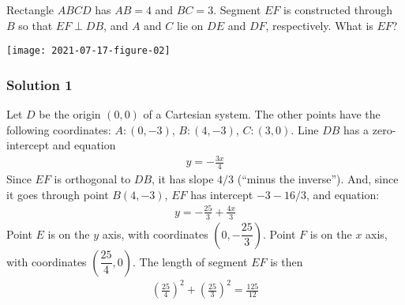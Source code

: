 \documentclass[12pt]{article}
\begin{document}
\nopagebreak

Rectangle $ABCD$ has $AB = 4$ and $BC = 3$. Segment $EF$ is constructed through $B$ so that $EF \perp DB$, and $A$ and $C$ lie on $DE$ and $DF$, respectively. What is $EF$?


\begin{answer}
\begin{center}
  \texttt{[image: 2021-07-17-figure-02]}
\end{center}
\subsubsection*{Solution 1}
Let $D$ be the origin $(0,0)$ of a Cartesian system. The other points have the following coordinates: $A:(0,-3)$, $B:(4,-3)$, $C:(3,0)$. Line $DB$ has a zero-intercept and equation
\begin{align*}
y = -\frac{3x}{4}
\end{align*}
Since $EF$ is orthogonal to $DB$, it has slope $4/3$ (``minus the inverse''). And, since it goes through point $B(4,-3)$, $EF$ has intercept $-3-16/3$, and equation:
\begin{align*}
y = -\frac{25}{3} + \frac{4x}{3}
\end{align*}
Point $E$ is on the $y$ axis, with coordinates $\left(0,-\dfrac{25}{3}\right)$. 
Point $F$ is on the $x$ axis, with coordinates $\left(\dfrac{25}{4},0\right)$. 
The length of segment $EF$ is then
\begin{align*}
\left(\frac{25}{4}\right)^2 + \left(\frac{25}{3}\right)^2
  = \frac{125}{12}
\end{align*}
\end{answer}
\end{document}
